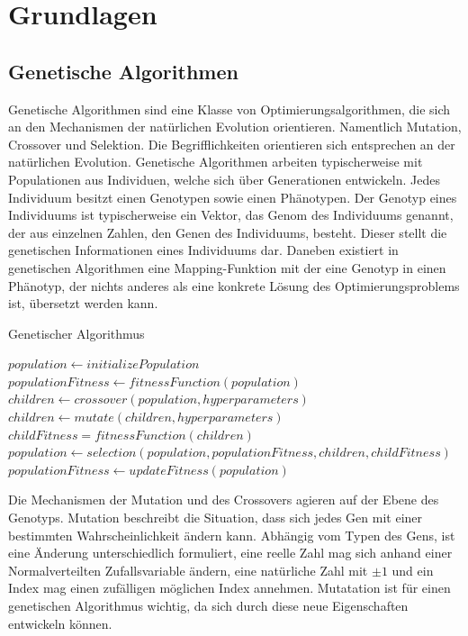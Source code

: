 \section{Grundlagen}

\subsection{Genetische Algorithmen}

Genetische Algorithmen sind eine Klasse von Optimierungsalgorithmen, die sich an den Mechanismen der natürlichen Evolution orientieren\cite{Simon.2013}.
Namentlich Mutation, Crossover und Selektion.
Die Begrifflichkeiten orientieren sich entsprechen an der natürlichen Evolution.
Genetische Algorithmen arbeiten typischerweise mit Populationen aus Individuen, welche sich über Generationen entwickeln.
Jedes Individuum besitzt einen Genotypen sowie einen Phänotypen.
Der Genotyp eines Individuums ist typischerweise ein Vektor, das Genom des Individuums genannt, der aus einzelnen Zahlen, den Genen des Individuums, besteht. Dieser stellt die genetischen Informationen eines Individuums dar. Daneben existiert in genetischen Algorithmen eine Mapping-Funktion mit der eine Genotyp in einen Phänotyp, der nichts anderes als eine konkrete Lösung des Optimierungsproblems ist, übersetzt werden kann.

\begin{algorithm}
\caption{Genetischer Algorithmus} \label{alg:geneticAlgorihtm}
\begin{algorithmic}[1]
	\State $population \gets initializePopulation$
	\State $populationFitness \gets fitnessFunction(population)$
		\State $children \gets crossover(population,hyperparameters)$
		\State $children \gets mutate(children,hyperparameters)$
		\State $childFitness = fitnessFunction(children)$
		\State $population \gets selection(population,populationFitness,children,childFitness)$
		\State $populationFitness \gets updateFitness(population)$
	\EndFor
	\EndProcedure
\end{algorithmic}
\end{algorithm}

Die Mechanismen der Mutation und des Crossovers agieren auf der Ebene des Genotyps.
Mutation beschreibt die Situation, dass sich jedes Gen mit einer bestimmten Wahrscheinlichkeit ändern kann. 
Abhängig vom Typen des Gens, ist eine Änderung unterschiedlich formuliert, eine reelle Zahl mag sich anhand einer Normalverteilten Zufallsvariable ändern, eine natürliche Zahl mit $\pm1$ und ein Index mag einen zufälligen möglichen Index annehmen. 
Mutatation ist für einen genetischen Algorithmus wichtig, da sich durch diese neue Eigenschaften entwickeln können.

